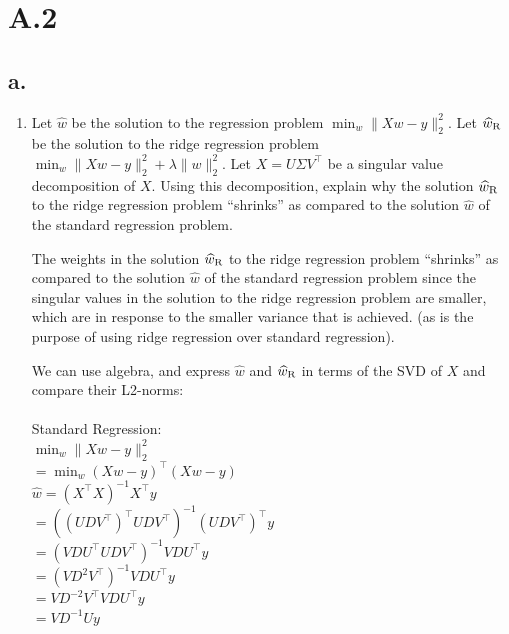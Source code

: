 \documentclass{article}
\newcommand{\1}{\mathbf{1}}
\newcommand{\twonorm}[1]{\|#1\|_2^2}
\begin{document}
\section*{A.2}
{\Large

\subsection*{a.}

\begin{enumerate}
  \item Let $\widehat{w}$ be the solution to the regression problem $\min_{w} \twonorm{Xw - y}$. Let $\widehat{w}_{\rm R}$ be the solution to the ridge regression problem $\min_w \twonorm{X w - y} + \lambda \twonorm{w}$. Let $X = U \Sigma V^\top$ be a singular value decomposition of $X$. Using this decomposition, explain why the solution $\widehat{w}_{\rm R}$ to the ridge regression problem ``shrinks'' as compared to the solution $\widehat{w}$ of the standard regression problem.
  
  The weights in the solution $\widehat{w}_{\rm R}$ to the ridge regression problem ``shrinks'' as compared to the solution $\widehat{w}$ of the standard regression problem since the singular values in the solution to the ridge regression problem are smaller, which are in response to the smaller variance that is achieved. (as is the purpose of using ridge regression over standard regression).



  We can use algebra, and express $\widehat{w}$ and $\widehat{w}_{\rm R}$ in terms of the SVD of $X$ and compare their L2-norms: \\ \\
  Standard Regression: \\
  $\min_w \twonorm{X w - y}$ \\
  $= \min_w (Xw - y)^\top(Xw-y)$ \\
  $\widehat{w} = (X^\top X)^{-1}X^\top y$ \\
  $= ((UDV^\top)^\top UDV^\top)^{-1}(UDV^\top)^\top y$ \\
  $= (VDU^\top UDV^\top)^{-1}VDU^\top y$ \\
  $= (VD^2V^\top)^{-1}VDU^\top y$ \\
  $= VD^{-2}V^\top VDU^\top y$ \\
  $= VD^{-1}U y$ \\


\end{enumerate}}
\end{document}
